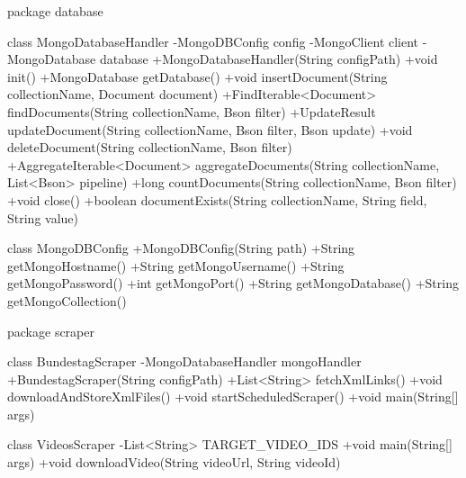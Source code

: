 package database {

  class MongoDatabaseHandler {
    -MongoDBConfig config
    -MongoClient client
    -MongoDatabase database
    +MongoDatabaseHandler(String configPath)
    +void init()
    +MongoDatabase getDatabase()
    +void insertDocument(String collectionName, Document document)
    +FindIterable<Document> findDocuments(String collectionName, Bson filter)
    +UpdateResult updateDocument(String collectionName, Bson filter, Bson update)
    +void deleteDocument(String collectionName, Bson filter)
    +AggregateIterable<Document> aggregateDocuments(String collectionName, List<Bson> pipeline)
    +long countDocuments(String collectionName, Bson filter)
    +void close()
    +boolean documentExists(String collectionName, String field, String value)
  }

  class MongoDBConfig {
    +MongoDBConfig(String path)
    +String getMongoHostname()
    +String getMongoUsername()
    +String getMongoPassword()
    +int getMongoPort()
    +String getMongoDatabase()
    +String getMongoCollection()
  }

}

package scraper {

  class BundestagScraper {
    -MongoDatabaseHandler mongoHandler
    +BundestagScraper(String configPath)
    +List<String> fetchXmlLinks()
    +void downloadAndStoreXmlFiles()
    +void startScheduledScraper()
    +void main(String[] args)
  }

  class VideosScraper {
    -List<String> TARGET_VIDEO_IDS
    +void main(String[] args)
    +void downloadVideo(String videoUrl, String videoId)
  }

}

